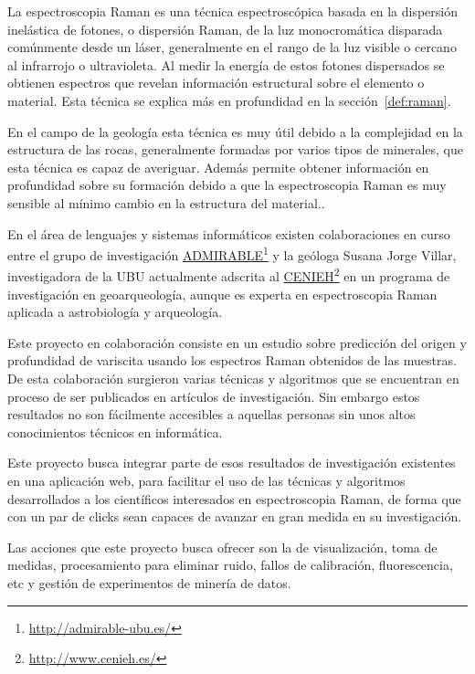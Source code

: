 \label{ch:introduccion}

La espectroscopia Raman es una técnica espectroscópica basada en la dispersión
inelástica de fotones, o dispersión Raman, de la luz monocromática disparada
comúnmente desde un láser\cite{raman-basics}, generalmente en el rango de la luz
visible o cercano al infrarrojo o ultravioleta\cite{wiki:raman-en}. Al medir la
energía de estos fotones dispersados se obtienen espectros que revelan
información estructural sobre el elemento o material. Esta técnica se explica
más en profundidad en la sección~\ref{def:raman}.

En el campo de la geología esta técnica es muy útil debido a la complejidad en
la estructura de las rocas, generalmente formadas por varios tipos de minerales,
que esta técnica es capaz de averiguar. Además permite obtener información en
profundidad sobre su formación debido a
que la espectroscopia Raman es muy sensible al mínimo cambio en la
estructura del material.\cite{quora:raman-geology}.

En el área de lenguajes y sistemas informáticos existen colaboraciones en curso
entre el grupo de investigación
\href{http://admirable-ubu.es/}{ADMIRABLE}\footnote{\url{http://admirable-ubu.es/}}
y la geóloga Susana Jorge Villar, investigadora de la UBU actualmente adscrita al
\href{http://www.cenieh.es/}{CENIEH}\footnote{\url{http://www.cenieh.es/}} en un
programa de investigación en geoarqueología\cite{susana-cenieh}, aunque es
experta en espectroscopia Raman aplicada a astrobiología y
arqueología\cite{susana-ubu}.

Este proyecto en colaboración consiste en un estudio sobre predicción del origen
y profundidad de variscita usando los espectros Raman obtenidos de las muestras.
De esta colaboración surgieron varias técnicas y algoritmos que se encuentran en
proceso de ser publicados en artículos de investigación. Sin embargo estos
resultados no son fácilmente accesibles a aquellas personas sin unos altos
conocimientos técnicos en informática.

Este proyecto busca integrar parte de esos resultados de investigación
existentes en una aplicación web, para facilitar el uso de las técnicas y
algoritmos desarrollados a los científicos interesados en espectroscopia Raman,
de forma que con un par de clicks sean capaces de avanzar en gran medida en su
investigación.

Las acciones que este proyecto busca ofrecer son la de visualización, toma de
medidas, procesamiento para eliminar ruido, fallos de calibración,
fluorescencia, etc y gestión de experimentos de minería de datos.

